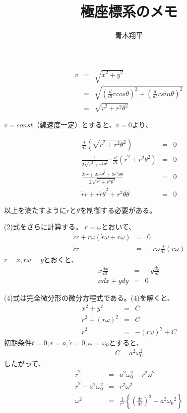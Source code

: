 \documentclass{article}
\title{極座標系のメモ}
\author{青木翔平}
\begin{document}
\maketitle

\begin{eqnarray}
v &=& \sqrt{\dot{x}^2 + \dot{y}^2} \nonumber \\
  &=& \sqrt{ \left(\frac{d}{dt} r cos\theta \right) ^2 + \left(\frac{d}{dt}r sin\theta\right) ^2} \nonumber \\
  &=& \sqrt{ \dot{r}^2+ r^2 \theta^2 } 
\end{eqnarray}	
	
$v=const$（線速度一定）とすると、$\dot{v} = 0$より、
	
\begin{eqnarray}
	\frac{d}{dt} \left(\sqrt{ \dot{r}^2+ r^2 \theta^2 } \right) &=& 0 \nonumber \\
\frac{1}{2\sqrt{ \dot{r}^2+ r^2 \theta^2 }} \cdot \frac{d}{dt}\left( \dot{r}^2+r^2 \theta^2 \right) &=& 0 \nonumber \\ 
\frac{2\dot{r}\ddot{r} + 2r\dot{r}\dot{\theta}^2 + 2r^2\dot{\theta}\ddot{\theta}}{2\sqrt{ \dot{r}^2+ r^2 \theta^2 }} &=& 0 \nonumber \\
\dot{r}\ddot{r} + r\dot{r}\dot{\theta}^2 + r^2\dot{\theta}\ddot{\theta} &=& 0  
\end{eqnarray}
	
以上を満たすように$r$と$\theta$を制御する必要がある。
	
(2)式をさらに計算する。
$r=\omega$とおいて、
\begin{eqnarray}
  \dot{r}\ddot{r}+r\omega(\dot{r}\omega+r\dot{\omega})&=&0 \nonumber \\
  \dot{r}\ddot{r} &=& -r\omega\frac{d}{dt}(r\omega) 
\end{eqnarray}
$\dot{r}=x, r\omega=y$とおくと、
\begin{eqnarray}
  x\frac{dx}{dt} &=& -y\frac{dy}{dt} \nonumber \\
  xdx + ydy &=& 0	
\end{eqnarray}

(4)式は完全微分形の微分方程式である。(4)を解くと、
\begin{eqnarray}
  x^2+y^2 &=& C  \nonumber \\
  \dot{r}^2 + (r\omega)^2 &=& C \nonumber \\
  \dot{r}^2 &=& -(r\omega)^2 + C 	
\end{eqnarray}
初期条件$t=0, r=a, \dot{r}=0, \omega=\omega_0$とすると、
\begin{eqnarray*}
  C=a^2\omega_0^2	
\end{eqnarray*}
したがって、
\begin{eqnarray}
  \dot{r}^2 &=& a^2 \omega_0^2 - r^2 \omega^2 \nonumber \\
  \dot{r}^2 - a^2 \omega_0^2 &=& r^2 \omega^2 \nonumber \\
  \omega^2 &=& \frac{1}{r^2} \left\{ \left( \frac{dr}{dt} \right)^2 - a^2 {\omega_0}^2  \right\}
\end{eqnarray}
\end{document}
